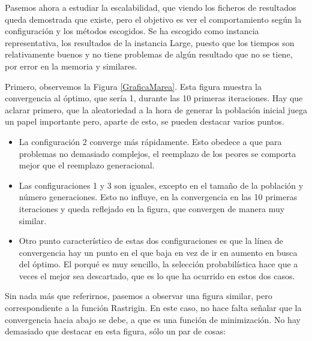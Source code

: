 \documentclass[runningheads]{llncs}
\begin{document}
Pasemos ahora a estudiar la escalabilidad, que viendo los ficheros de resultados queda demostrada que existe, pero el objetivo es 
ver el comportamiento según la configuración y los métodos escogidos. Se ha escogido como instancia representativa, los resultados 
de la instancia Large, puesto que los tiempos son relativamente buenos y no tiene problemas de algún resultado que no se tiene, 
por error en la memoria y similares.\vspace{12pt}

Primero, observemos la Figura \ref{GraficaMarea}. Esta figura muestra la convergencia al óptimo, que sería 1, durante las 10 
primeras iteraciones. Hay que aclarar primero, que la aleatoriedad a la hora de generar la población inicial juega un papel 
importante pero, aparte de esto, se pueden destacar varios puntos.

\begin{itemize}
 \item La configuración 2 converge más rápidamente. Esto obedece a que para problemas no demasiado complejos, el reemplazo 
 de los peores se comporta mejor que el reemplazo generacional.
 \item Las configuraciones 1 y 3 son iguales, excepto en el tamaño de la población y número generaciones. Esto no influye, 
 en la convergencia en las 10 primeras iteraciones y queda reflejado en la figura, que convergen de manera muy similar.
 \item Otro punto característico de estas dos configuraciones es que la línea de convergencia hay un punto en el que 
 baja en vez de ir en aumento en busca del óptimo. El porqué es muy 
 sencillo, la selección probabilística hace que a veces el mejor sea descartado, que es lo que ha ocurrido en estos dos 
 casos.
\end{itemize}



Sin nada más que referirnos, pasemos a observar una figura similar, pero correspondiente a la función Rastrigin. En este caso, 
no hace falta señalar que la convergencia hacia abajo se debe, a que es una función de minimización. No hay demasiado que 
destacar en esta figura, sólo un par de cosas:
\end{document}
